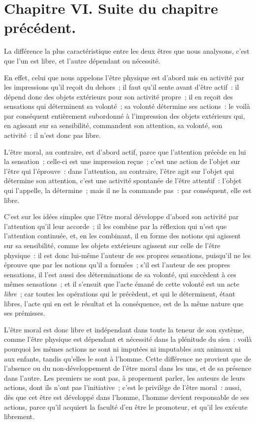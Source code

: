 \documentclass[french,twoside]{book} %
\newcommand\chapteropen{} %
\newcommand\chaptercont{} %
\newcommand\chapterclose{} %
\begin{document}
\chapteropen
\chapter[{Chapitre VI. Suite du chapitre précédent.}]{Chapitre VI. Suite du chapitre précédent.}\renewcommand{\leftmark}{Chapitre VI. Suite du chapitre précédent.}


\chaptercont
\noindent La différence la plus caractéristique entre les deux êtres que nous analysons, c’est que l’un est libre, et l’autre dépendant ou nécessité.\par
En effet, celui que nous appelons l’être physique est d’abord mis en activité par les impressions qu’il reçoit du dehors ; il faut qu’il sente avant d’être actif : il dépend donc des objets extérieurs pour son activité propre ; il en reçoit des sensations qui déterminent sa volonté ; sa volonté détermine ses actions : le voilà par conséquent entièrement subordonné à l’impression des objets extérieurs qui, en agissant sur sa sensibilité, commandent son attention, sa volonté, son activité : il n’est donc pas libre.\par
L’être moral, au contraire, est d’abord actif, parce que l’attention précède en lui la sensation ; celle-ci est une impression reçue ; c’est une action de l’objet sur l’être qui l’éprouve : dans l’attention, au contraire, l’être agit sur l’objet qui détermine son attention, c’est une activité spontanée de l’être attentif : l’objet qui l’appelle, la détermine ; mais il ne la commande pas : par conséquent, elle est libre.\par
C’est sur les idées simples que l’être moral développe d’abord son activité par l’attention qu’il leur accorde ; il les combine par la réflexion qui n’est que l’attention continuée, et, en les combinant, il en forme des notions qui agissent sur sa sensibilité, comme les objets extérieurs agissent sur celle de l’être physique : il est donc lui-même l’auteur de ses propres sensations, puisqu’il ne les éprouve que par les notions qu’il a formées ; s’il est l’auteur de ses propres sensations, il l’est aussi des déterminations de sa volonté, qui succèdent à ces mêmes sensations ; et il s’ensuit que l’acte émané de cette volonté est un acte {\itshape libre} ; car toutes les opérations qui le précèdent, et qui le déterminent, étant libres, l’acte qui en est le résultat et la conséquence, est de la même nature que ses prémisses.\par
L’être moral est donc libre et indépendant dans toute la teneur de son système, comme l’être physique est dépendant et nécessité dans la plénitude du sien : voilà pourquoi les mêmes actions ne sont ni imputées ni imputables aux animaux ni aux enfants, tandis qu’elles le sont à l’homme. Cette différence ne provient que de l’absence ou du non-développement de l’être moral dans les uns, et de sa présence dans l’autre. Les premiers ne sont pas, à proprement parler, les auteurs de leurs actions, dont ils n’ont pas l’initiative ; c’est le privilège de l’être moral : aussi, dès que cet être est développé dans l’homme, l’homme devient responsable de ses actions, parce qu’il acquiert la faculté d’en être le promoteur, et qu’il les exécute librement.
\chapterclose
\end{document}
